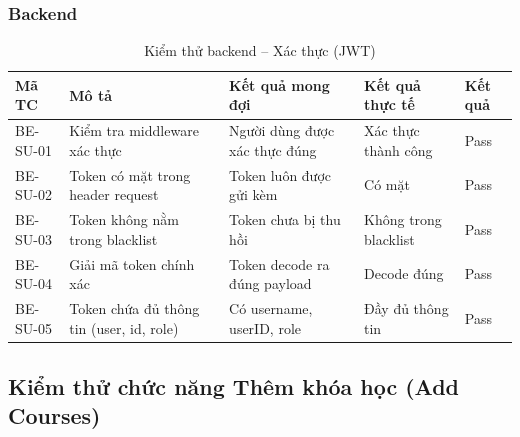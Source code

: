 \subsubsection{Backend}
\begin{table}[H]
\centering
\caption{Kiểm thử backend – Xác thực (JWT)}
\label{tab:be_sign}
\begin{tabular}{|p{1.8cm}|p{4cm}|p{4cm}|p{2.2cm}|p{1.5cm}|}
\hline
\textbf{Mã TC} & \textbf{Mô tả} & \textbf{Kết quả mong đợi} & \textbf{Kết quả thực tế} & \textbf{Kết quả} \\ \hline
BE-SU-01 & Kiểm tra middleware xác thực & Người dùng được xác thực đúng & Xác thực thành công & Pass \\ \hline
BE-SU-02 & Token có mặt trong header request & Token luôn được gửi kèm & Có mặt & Pass \\ \hline
BE-SU-03 & Token không nằm trong blacklist & Token chưa bị thu hồi & Không trong blacklist & Pass \\ \hline
BE-SU-04 & Giải mã token chính xác & Token decode ra đúng payload & Decode đúng & Pass \\ \hline
BE-SU-05 & Token chứa đủ thông tin (user, id, role) & Có username, userID, role & Đầy đủ thông tin & Pass \\ \hline
\end{tabular}
\end{table}

\subsection{Kiểm thử chức năng Thêm khóa học (Add Courses)}

